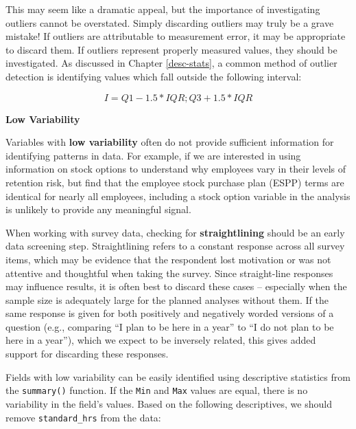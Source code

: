 \documentclass[
]{book}
\newenvironment{Shaded}{\begin{snugshade}}{\end{snugshade}}
\newcommand{\CommentTok}[1]{\textcolor[rgb]{0.56,0.35,0.01}{\textit{#1}}}
\newcommand{\FunctionTok}[1]{\textcolor[rgb]{0.00,0.00,0.00}{#1}}
\newcommand{\NormalTok}[1]{#1}
\newcommand{\SpecialCharTok}[1]{\textcolor[rgb]{0.00,0.00,0.00}{#1}}
\begin{document}
This may seem like a dramatic appeal, but the importance of investigating outliers cannot be overstated. Simply discarding outliers may truly be a grave mistake! If outliers are attributable to measurement error, it may be appropriate to discard them. If outliers represent properly measured values, they should be investigated. As discussed in Chapter \ref{desc-stats}, a common method of outlier detection is identifying values which fall outside the following interval:

\[I = Q1 - 1.5 * IQR; Q3 + 1.5 * IQR\]

\textbf{Low Variability}

Variables with \textbf{low variability} often do not provide sufficient information for identifying patterns in data. For example, if we are interested in using information on stock options to understand why employees vary in their levels of retention risk, but find that the employee stock purchase plan (ESPP) terms are identical for nearly all employees, including a stock option variable in the analysis is unlikely to provide any meaningful signal.

When working with survey data, checking for \textbf{straightlining} should be an early data screening step. Straightlining refers to a constant response across all survey items, which may be evidence that the respondent lost motivation or was not attentive and thoughtful when taking the survey. Since straight-line responses may influence results, it is often best to discard these cases -- especially when the sample size is adequately large for the planned analyses without them. If the same response is given for both positively and negatively worded versions of a question (e.g., comparing ``I plan to be here in a year'' to ``I do not plan to be here in a year''), which we expect to be inversely related, this gives added support for discarding these responses.

Fields with low variability can be easily identified using descriptive statistics from the \texttt{summary()} function. If the \texttt{Min} and \texttt{Max} values are equal, there is no variability in the field's values. Based on the following descriptives, we should remove \texttt{standard\_hrs} from the data:

\begin{Shaded}
\end{Shaded}
\end{document}
